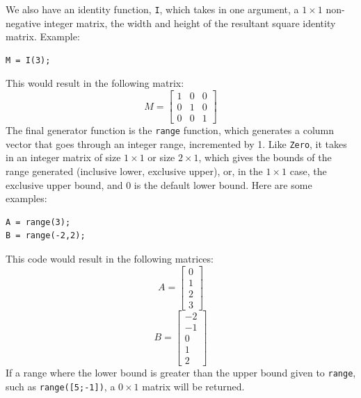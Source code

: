 We also have an identity function, \verb=I=, which takes in one argument, a $1\times 1$ non-negative integer matrix, the width and height of the resultant square identity matrix.  Example:\begin{lstlisting}
M = I(3);
\end{lstlisting}
This would result in the following matrix:
$$M=\begin{bmatrix}1&0&0\\0&1&0\\0&0&1\end{bmatrix}$$
The final generator function is the \verb=range= function, which generates a column vector that goes through an integer range, incremented by 1.  Like \verb=Zero=, it takes in an integer matrix of size $1\times 1$ or size $2\times 1$, which gives the bounds of the range generated (inclusive lower, exclusive upper), or, in the $1\times 1$ case, the exclusive upper bound, and 0 is the default lower bound.  Here are some examples:
\begin{lstlisting}
A = range(3);
B = range(-2,2);
\end{lstlisting}
This code would result in the following matrices:
$$A = \begin{bmatrix}0\\1\\2\\3\end{bmatrix}$$
$$B = \begin{bmatrix}-2\\-1 \\0\\1\\2\end{bmatrix}$$
If a range where the lower bound is greater than the upper bound given to \verb=range=, such as \verb=range([5;-1])=, a $0 \times 1$ matrix will be returned.

